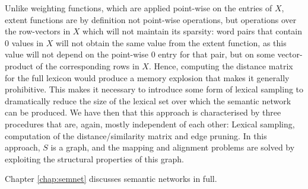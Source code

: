 Unlike weighting functions, which are applied point-wise on the entries of $X$, extent functions are by definition not point-wise operations, but operations over the row-vectors in $X$ which will not maintain its sparsity: word pairs that contain $0$ values in $X$ will not obtain the same value from the extent function, as this value will not depend on the point-wise $0$ entry for that pair, but on some vector-product of the corresponding rows in $X$.
Hence, computing the distance matrix for the full lexicon would produce a memory explosion that makes it generally prohibitive.
This makes it necessary to introduce some form of lexical sampling to dramatically reduce the size of the lexical set over which the semantic network can be produced.
We have then that this approach is characterised by three procedures that are, again, mostly independent of each other:
Lexical sampling, computation of the distance/similarity matrix and edge pruning.
In this approach, $S$ is a graph, and the mapping and alignment problems are solved by exploiting the structural properties of this graph.

Chapter \ref{chap:semnet} discusses semantic networks in full.

